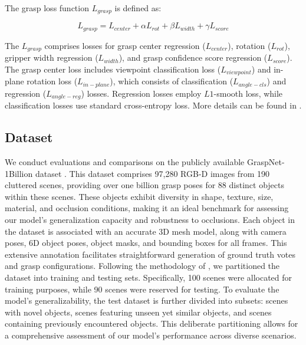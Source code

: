 The grasp loss function $L_{grasp}$ is defined as:

\begin{equation}
L_{grasp} = L_{center} + \alpha L_{rot} + \beta L_{width} + \gamma L_{score}
\end{equation}

The $L_{grasp}$ comprises losses for grasp center regression ($L_{center}$), rotation ($L_{rot}$), gripper width regression ($L_{width}$), and grasp confidence score regression ($L_{score}$). The grasp center loss includes viewpoint classification loss ($L_{viewpoint}$) and in-plane rotation loss ($L_{in-plane}$), which consists of classification ($L_{angle-cls}$) and regression ($L_{angle-reg}$) losses. Regression losses employ $L1$-smooth loss, while classification losses use standard cross-entropy loss. More details can be found in \cite{hoang2023grasp}.


\subsection{Dataset}

We conduct evaluations and comparisons on the publicly available GraspNet-1Billion dataset \cite{fang2020graspnet}. This dataset comprises 97,280 RGB-D images from 190 cluttered scenes, providing over one billion grasp poses for 88 distinct objects within these scenes. These objects exhibit diversity in shape, texture, size, material, and occlusion conditions, making it an ideal benchmark for assessing our model's generalization capacity and robustness to occlusions. Each object in the dataset is associated with an accurate 3D mesh model, along with camera poses, 6D object poses, object masks, and bounding boxes for all frames. This extensive annotation facilitates straightforward generation of ground truth votes and grasp configurations. Following the methodology of \cite{fang2020graspnet}, we partitioned the dataset into training and testing sets. Specifically, 100 scenes were allocated for training purposes, while 90 scenes were reserved for testing. To evaluate the model's generalizability, the test dataset is further divided into subsets: scenes with novel objects, scenes featuring unseen yet similar objects, and scenes containing previously encountered objects. This deliberate partitioning allows for a comprehensive assessment of our model's performance across diverse scenarios.
